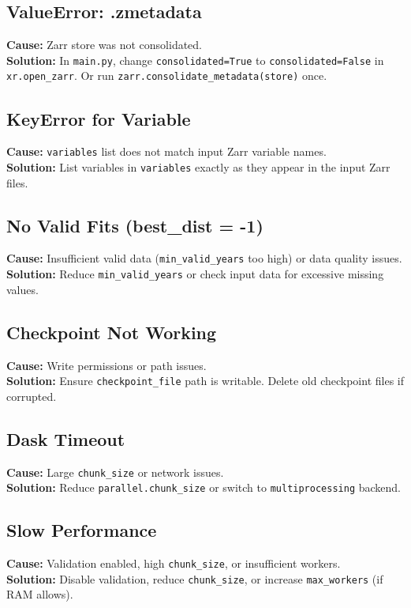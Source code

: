 \documentclass[12pt,a4paper]{article}
\begin{document}
\subsection{ValueError: .zmetadata}
\textbf{Cause:} Zarr store was not consolidated. \\
\textbf{Solution:} In \texttt{main.py}, change \texttt{consolidated=True} to \texttt{consolidated=False} in \texttt{xr.open\_zarr}. Or run \texttt{zarr.consolidate\_metadata(store)} once.

\subsection{KeyError for Variable}
\textbf{Cause:} \texttt{variables} list does not match input Zarr variable names. \\
\textbf{Solution:} List variables in \texttt{variables} exactly as they appear in the input Zarr files.

\subsection{No Valid Fits (best\_dist = -1)}
\textbf{Cause:} Insufficient valid data (\texttt{min\_valid\_years} too high) or data quality issues. \\
\textbf{Solution:} Reduce \texttt{min\_valid\_years} or check input data for excessive missing values.

\subsection{Checkpoint Not Working}
\textbf{Cause:} Write permissions or path issues. \\
\textbf{Solution:} Ensure \texttt{checkpoint\_file} path is writable. Delete old checkpoint files if corrupted.

\subsection{Dask Timeout}
\textbf{Cause:} Large \texttt{chunk\_size} or network issues. \\
\textbf{Solution:} Reduce \texttt{parallel.chunk\_size} or switch to \texttt{multiprocessing} backend.

\subsection{Slow Performance}
\textbf{Cause:} Validation enabled, high \texttt{chunk\_size}, or insufficient workers. \\
\textbf{Solution:} Disable validation, reduce \texttt{chunk\_size}, or increase \texttt{max\_workers} (if RAM allows).
\end{document}

